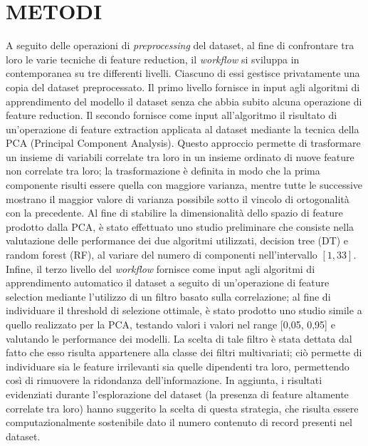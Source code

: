 \section{METODI}
A seguito delle operazioni di \textit{preprocessing} del dataset, al fine di confrontare tra loro le varie tecniche di feature reduction, il \textit{workflow} si sviluppa in contemporanea su tre differenti livelli.
Ciascuno di essi gestisce privatamente una copia del dataset preprocessato.
Il primo livello fornisce in input agli algoritmi di apprendimento del modello il dataset senza che abbia subito alcuna operazione di feature reduction.
Il secondo fornisce come input all'algoritmo il risultato di un'operazione di feature extraction applicata al dataset mediante la tecnica della PCA (Principal Component Analysis). Questo approccio permette di trasformare un insieme di variabili correlate tra loro in un insieme ordinato di nuove feature non correlate tra loro; la trasformazione è definita in modo che la prima componente risulti essere quella con maggiore varianza, mentre tutte le successive mostrano il maggior valore di varianza possibile sotto il vincolo di ortogonalità con la precedente.
Al fine di stabilire la dimensionalità dello spazio di feature prodotto dalla PCA, è stato effettuato uno studio preliminare che consiste nella valutazione delle performance dei due algoritmi utilizzati, decision tree (DT) e random forest (RF), al variare del numero di componenti nell'intervallo $[1, 33]$.\\
Infine, il terzo livello del \textit{workflow} fornisce come input agli algoritmi di apprendimento automatico il dataset a seguito di un'operazione di feature selection mediante l'utilizzo di un filtro basato sulla correlazione; al fine di individuare il threshold di selezione ottimale, è stato prodotto uno studio simile a quello realizzato per la PCA, testando valori i valori nel range [0,05, 0,95] e valutando le performance dei modelli.
La scelta di tale filtro è stata dettata dal fatto che esso risulta appartenere alla classe dei filtri multivariati; ciò permette di individuare sia le feature irrilevanti sia quelle dipendenti tra loro, permettendo così di rimuovere la ridondanza dell'informazione. 
In aggiunta, i risultati evidenziati durante l'esplorazione del dataset (la presenza di feature altamente correlate tra loro) hanno suggerito la scelta di questa strategia, che risulta essere computazionalmente sostenibile dato il numero contenuto di record presenti nel dataset.

